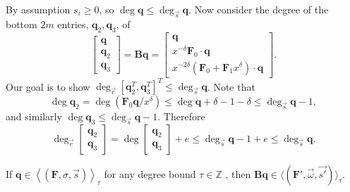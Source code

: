 \begin{pf}
By assumption $s_{i}\ge0$, so $\deg\mathbf{q}\le\deg_{\vec{s}}\mathbf{q}.$
Now consider the degree of the bottom $2m$ entries, $\mathbf{q}_{2},\mathbf{q}_{3}$,
of \[
\begin{bmatrix}\mathbf{q}\\
\mathbf{q}_{2}\\
\mathbf{q}_{3}\end{bmatrix}=\mathbf{B}\mathbf{q}=\left[\begin{array}{r}
\mathbf{q}\\
x^{-\delta}\mathbf{F}_{0}\cdot\mathbf{q}\\
x^{-2\delta}\left(\mathbf{F}_{0}+\mathbf{F}_{1}x^{\delta}\right)\cdot\mathbf{q}\end{array}\right].\]
 Our goal is to show $\deg_{\vec{e}}\left[\mathbf{q}_{2}^{T},\mathbf{q}_{3}^{T}\right]^{T}\le\deg_{\vec{s}}\mathbf{q}$.
Note that \[
\deg\mathbf{q}_{2}=\deg\left(\mathbf{F}_{0}\mathbf{q}/x^{\delta}\right)\le\deg\mathbf{q}+\delta-1-\delta\le\deg_{\vec{s}}\mathbf{q}-1,\]
 and similarly $\deg\mathbf{q}_{3}\le\deg_{\vec{s}}\mathbf{q}-1$.
Therefore \[
\deg_{\vec{e}}\begin{bmatrix}\mathbf{q}_{2}\\
\mathbf{q}_{3}\end{bmatrix}=\deg\begin{bmatrix}\mathbf{q}_{2}\\
\mathbf{q}_{3}\end{bmatrix}+e\le\deg_{\vec{s}}\mathbf{q}-1+e\le\deg_{\vec{s}}\mathbf{q}.\]
 \end{pf}
\begin{cor}
\label{cor:sToBs}If $\mathbf{q}\in\left\langle \left(\mathbf{F},\sigma,\vec{s}\right)\right\rangle _{\tau}$
for any degree bound $\tau\in\mathbb{Z}$ , then\textup{ }$\mathbf{B}\mathbf{q}\in\langle(\mathbf{F}',\vec{\omega},\vec{s'})\rangle_{\tau}$\textup{.} 
\end{cor}

